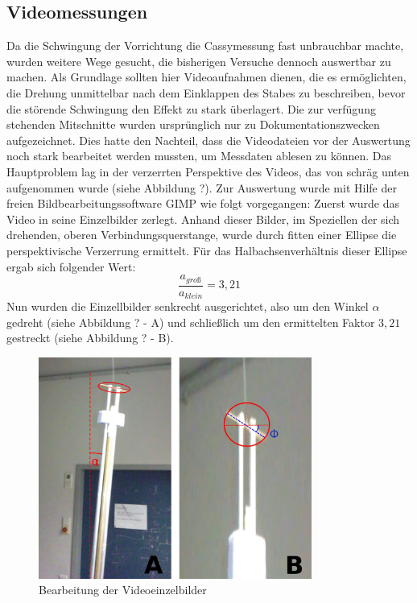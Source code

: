 \documentclass[11pt]{scrartcl}
\begin{document}
\subsection{Videomessungen} %
Da die Schwingung der Vorrichtung die Cassymessung fast unbrauchbar machte, wurden weitere Wege gesucht, die bisherigen Versuche dennoch auswertbar zu machen. Als Grundlage sollten hier Videoaufnahmen dienen, die es ermöglichten, die Drehung unmittelbar nach dem Einklappen des Stabes zu beschreiben, bevor die störende Schwingung den Effekt zu stark überlagert. Die zur verfügung stehenden Mitschnitte wurden ursprünglich nur zu Dokumentationszwecken aufgezeichnet. Dies hatte den Nachteil, dass die Videodateien vor der Auswertung noch stark bearbeitet werden mussten, um Messdaten ablesen zu können. Das Hauptproblem lag in der verzerrten Perspektive des Videos, das von schräg unten aufgenommen wurde (siehe Abbildung ?). Zur Auswertung wurde mit Hilfe der freien Bildbearbeitungssoftware GIMP wie folgt vorgegangen: Zuerst wurde das Video in seine Einzelbilder zerlegt. Anhand dieser Bilder, im Speziellen der sich drehenden, oberen Verbindungsquerstange, wurde durch fitten einer Ellipse die perspektivische Verzerrung ermittelt. Für das Halbachsenverhältnis dieser Ellipse ergab sich folgender Wert:
\[\frac{a_{groß}}{a_{klein}}=3,21\]
Nun wurden die Einzellbilder senkrecht ausgerichtet, also um den Winkel $\alpha$ gedreht (siehe Abbildung ? - A) und schließlich um den ermittelten Faktor $3,21$ gestreckt (siehe Abbildung ? - B).
\begin{figure}[h]
\begin{center}
\includegraphics[width=0.8\textwidth]{images/auswert.jpg}
\end{center}
\vspace{-1.5\baselineskip}
\caption{Bearbeitung der Videoeinzelbilder}
\label{Videobearbeitung}
\end{figure}
\end{document}
